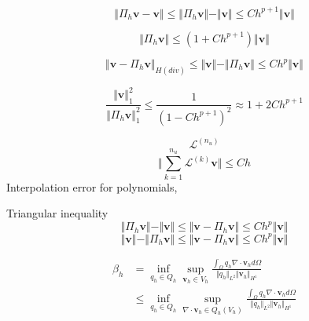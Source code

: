 \begin{equation}
\Vert \Pi_h \boldsymbol v - \boldsymbol v \Vert \le \Vert \Pi_h \boldsymbol v \Vert - \Vert \boldsymbol v \Vert \le Ch^{p+1}\Vert \boldsymbol v \Vert
\end{equation}

\begin{equation}
    \Vert \Pi_h \boldsymbol v \Vert \le (1+Ch^{p+1})\Vert \boldsymbol v \Vert
\end{equation}

\begin{equation}
    \Vert \boldsymbol v - \Pi_h \boldsymbol v \Vert_{H(div)} \le \Vert \boldsymbol v \Vert - \Vert \Pi_h \boldsymbol v \Vert \le Ch^{p}\Vert \boldsymbol v \Vert
\end{equation}

\begin{equation}
\frac{\Vert \boldsymbol v \Vert_1^2}{\Vert \Pi_h \boldsymbol v \Vert_1^2} \le \frac{1}{(1-Ch^{p+1})^2} \approx 1 + 2Ch^{p+1}
\end{equation}

\begin{equation}
    \mathcal L^{(n_u)}
\end{equation}
\begin{equation}
    \Vert \sum_{k=1}^{n_u} \mathcal L^{(k)} \boldsymbol v \Vert \le C h
\end{equation}
Interpolation error for polynomials, 

Triangular inequality
\begin{equation}
\Vert \Pi_h \boldsymbol v \Vert - \Vert \boldsymbol v \Vert \le \Vert \boldsymbol v - \Pi_h \boldsymbol v \Vert \le Ch^{p} \Vert \boldsymbol v \Vert
\end{equation}
\begin{equation}
\Vert \boldsymbol v \Vert - \Vert \Pi_h \boldsymbol v \Vert \le \Vert \boldsymbol v - \Pi_h \boldsymbol v \Vert \le Ch^{p} \Vert \boldsymbol v \Vert
\end{equation}


\begin{equation}
\begin{split}
\beta_h &= \inf_{q_h \in Q_h} \sup_{\boldsymbol v_h \in V_h} \frac{\int_{\Omega} q_h \nabla \cdot \boldsymbol v_h d\Omega}{\Vert q_h \Vert_{L^2} \Vert \boldsymbol v_h \Vert_{H^1}} \\
    &\le \inf_{q_h \in Q_h} \sup_{\nabla \cdot \boldsymbol v_h \in Q_h(V_h)} \frac{\int_{\Omega} q_h \nabla \cdot \boldsymbol v_h d\Omega}{\Vert q_h \Vert_{L^2} \Vert \boldsymbol v_h \Vert_{H^1}} \\
\end{split}
\end{equation}



